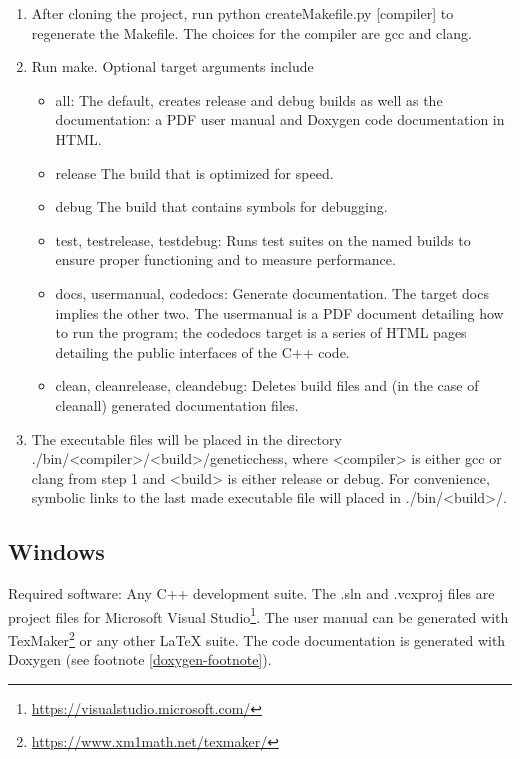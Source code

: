 \documentclass[letterpaper]{article}
\newcommand{\cpp}{C{\nobreak+}{\nobreak+}}
\newcommand{\code}[1]{\small\textsf{#1}}
\renewcommand{\_}{\allowbreak\textunderscore\allowbreak}
\begin{document}
\begin{enumerate}
	\item After cloning the project, run \code{python create\_Makefile.py [compiler]} to regenerate the Makefile. The choices for the compiler are \code{gcc} and \code{clang}.
	\item Run \code{make}. Optional target arguments include
		\begin{itemize}
			\item \code{all}: The default, creates \code{release} and \code{debug} builds as well as the documentation: a PDF user manual and Doxygen code documentation in HTML.
			\item \code{release} The build that is optimized for speed.
			\item \code{debug} The build that contains symbols for debugging.
			\item \code{test}, \code{test\_release}, \code{test\_debug}: Runs test suites on the named builds to ensure proper functioning and to measure performance.
			\item \code{docs}, \code{user\_manual}, \code{code\_docs}: Generate documentation. The target \code{docs} implies the other two. The \code{user\_manual} is a PDF document detailing how to run the program; the \code{code\_docs} target is a series of HTML pages detailing the public interfaces of the \cpp{} code.
			\item \code{clean}, \code{clean\_release}, \code{clean\_debug}: Deletes build files and (in the case of \code{clean\_all}) generated documentation files.
		\end{itemize}
		\item The executable files will be placed in the directory \code{./bin/<compiler>/<build>/\allowbreak{}genetic\_chess}, where \code{<compiler>} is either \code{gcc} or \code{clang} from step 1 and \code{<build>} is either \code{release} or \code{debug}. For convenience, symbolic links to the last made executable file will placed in \code{./bin/<build>/}.
\end{enumerate}

\subsection{Windows}
Required software: Any \cpp{} development suite. The \code{.sln} and \code{.vcxproj} files are project files for Microsoft Visual Studio\footnote{\url{https://visualstudio.microsoft.com/}}. The user manual can be generated with TexMaker\footnote{\url{https://www.xm1math.net/texmaker/}} or any other \LaTeX{} suite. The code documentation is generated with Doxygen (see footnote \ref{doxygen-footnote}).
\end{document}
